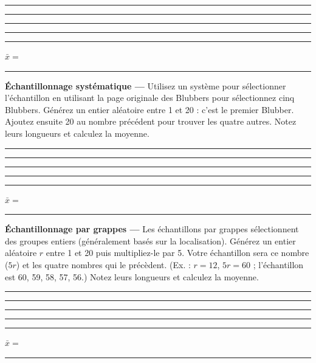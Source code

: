 \documentclass[11pt]{article}
\begin{document}
\rule{1.6cm}{0.4pt}\hspace{0.6em}
\rule{1.6cm}{0.4pt}\hspace{0.6em}
\rule{1.6cm}{0.4pt}\hspace{0.6em}
\rule{1.6cm}{0.4pt}\hspace{0.6em}
\rule{1.6cm}{0.4pt}\hfill
$\bar{x} = $ \rule{2.2cm}{0.4pt}

\textbf{Échantillonnage systématique —}
Utilisez un système pour sélectionner l’échantillon en utilisant la page originale des Blubbers pour sélectionnez cinq Blubbers.
Générez un entier aléatoire entre 1 et 20 : c’est le premier Blubber.
Ajoutez ensuite 20 au nombre précédent pour trouver les quatre autres.
Notez leurs longueurs et calculez la moyenne.\\[-0.4em]

\rule{1.6cm}{0.4pt}\hspace{0.6em}
\rule{1.6cm}{0.4pt}\hspace{0.6em}
\rule{1.6cm}{0.4pt}\hspace{0.6em}
\rule{1.6cm}{0.4pt}\hspace{0.6em}
\rule{1.6cm}{0.4pt}\hfill
$\bar{x} = $ \rule{2.2cm}{0.4pt}

\textbf{Échantillonnage par grappes —}
Les échantillons par grappes sélectionnent des groupes entiers (généralement basés sur la localisation).
Générez un entier aléatoire $r$ entre 1 et 20 puis multipliez-le par 5.
Votre échantillon sera ce nombre ($5r$) et les quatre nombres qui le précèdent.
(Ex. : $r = 12$, $5r = 60$ ; l’échantillon est 60, 59, 58, 57, 56.)
Notez leurs longueurs et calculez la moyenne.\\[-0.4em]

\rule{1.6cm}{0.4pt}\hspace{0.6em}
\rule{1.6cm}{0.4pt}\hspace{0.6em}
\rule{1.6cm}{0.4pt}\hspace{0.6em}
\rule{1.6cm}{0.4pt}\hspace{0.6em}
\rule{1.6cm}{0.4pt}\hfill
$\bar{x} = $ \rule{2.2cm}{0.4pt}
\end{document}
